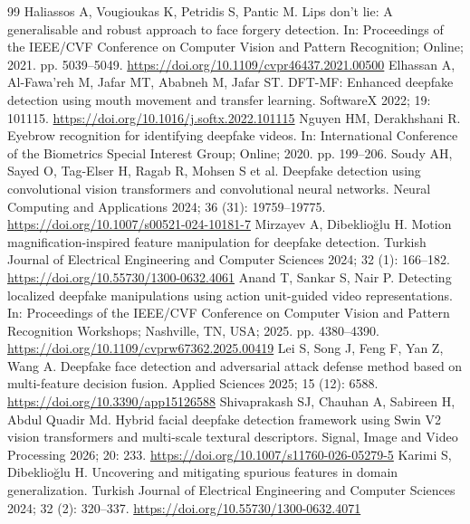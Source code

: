 \documentclass[a4paper]{elektr}
\begin{document}
\begin{thebibliography}{99}
 Haliassos A, Vougioukas K, Petridis S, Pantic M. Lips don’t lie: A generalisable and robust approach to face forgery detection. In: Proceedings of the IEEE/CVF Conference on Computer Vision and Pattern Recognition; Online; 2021. pp. 5039--5049. \url{https://doi.org/10.1109/cvpr46437.2021.00500}
 Elhassan A, Al-Fawa’reh M, Jafar MT, Ababneh M, Jafar ST. DFT-MF: Enhanced deepfake detection using mouth movement and transfer learning. SoftwareX 2022; 19: 101115. \url{https://doi.org/10.1016/j.softx.2022.101115}
 Nguyen HM, Derakhshani R. Eyebrow recognition for identifying deepfake videos. In: International Conference of the Biometrics Special Interest Group; Online; 2020. pp. 199--206.
 Soudy AH, Sayed O, Tag-Elser H, Ragab R, Mohsen S et al. Deepfake detection using convolutional vision transformers and convolutional neural networks. Neural Computing and Applications 2024; 36 (31): 19759--19775. \url{https://doi.org/10.1007/s00521-024-10181-7}
 Mirzayev A, Dibeklioğlu H. Motion magnification-inspired feature manipulation for deepfake detection. Turkish Journal of Electrical Engineering and Computer Sciences 2024; 32 (1): 166--182. \url{https://doi.org/10.55730/1300-0632.4061}
 Anand T, Sankar S, Nair P. Detecting localized deepfake manipulations using action unit-guided video representations. In: Proceedings of the IEEE/CVF Conference on Computer Vision and Pattern Recognition Workshops; Nashville, TN, USA; 2025. pp. 4380--4390. \url{https://doi.org/10.1109/cvprw67362.2025.00419}
 Lei S, Song J, Feng F, Yan Z, Wang A. Deepfake face detection and adversarial attack defense method based on multi-feature decision fusion. Applied Sciences 2025; 15 (12): 6588. \url{https://doi.org/10.3390/app15126588}
 Shivaprakash SJ, Chauhan A, Sabireen H, Abdul Quadir Md. Hybrid facial deepfake detection framework using Swin V2 vision transformers and multi-scale textural descriptors. Signal, Image and Video Processing 2026; 20: 233. \url{https://doi.org/10.1007/s11760-026-05279-5}
 Karimi S, Dibeklioğlu H. Uncovering and mitigating spurious features in domain generalization. Turkish Journal of Electrical Engineering and Computer Sciences 2024; 32 (2): 320--337. \url{https://doi.org/10.55730/1300-0632.4071}
\end{thebibliography}
\end{document}
